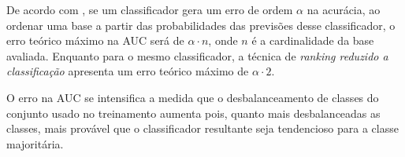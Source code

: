 De acordo com \cite{langford08}, se um classificador gera um erro de ordem $\alpha$ na acurácia, ao ordenar uma base a partir das probabilidades das previsões desse classificador, o erro teórico máximo na AUC será de $\alpha \cdot n$, onde $n$ é a cardinalidade da base avaliada. Enquanto para o mesmo classificador, a técnica de \emph{ranking reduzido a classificação} apresenta um erro teórico máximo de $\alpha \cdot 2$.

O erro na AUC se intensifica a medida que o desbalanceamento de classes do conjunto usado no treinamento aumenta pois, quanto mais desbalanceadas as classes, mais provável que o classificador resultante seja tendencioso para a classe majoritária.